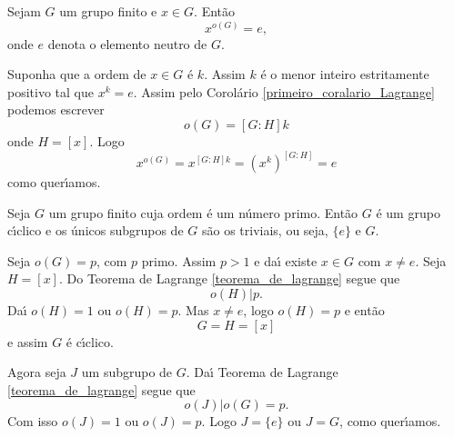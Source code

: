 \begin{corolario}
    Sejam $G$ um grupo finito e $x \in G$. Ent\~ao
    \[
        x^{o(G)} = e,
    \]
    onde $e$ denota o elemento neutro de $G$.
\end{corolario}
\begin{prova}
    Suponha que a ordem de $x \in G$ \'e $k$. Assim $k$ \'e o menor inteiro estritamente positivo tal que $x^k = e$. Assim pelo Corol\'ario \eqref{primeiro_coralario_Lagrange} podemos escrever
    \[
        o(G) = [G : H]k
    \]
    onde $H = [x]$. Logo
    \[
        x^{o(G)} = x^{[G : H]k} = (x^k)^{[G : H]} = e
    \]
    como quer{\'\i}amos.
\end{prova}

\begin{corolario}
    Seja $G$ um grupo finito cuja ordem \'e um n\'umero primo. Ent\~ao $G$ \'e um grupo c{\'\i}clico e os \'unicos subgrupos de $G$ s\~ao os triviais, ou seja, $\{e\}$ e $G$.
\end{corolario}
\begin{prova}
    Seja $o(G) = p$, com $p$ primo. Assim $p > 1$ e da{\'\i} existe $x \in G$ com $x \ne e$. Seja $H = [x]$. Do Teorema de Lagrange \eqref{teorema_de_lagrange} segue que
    \[
        o(H) | p.
    \]
    Da{\'\i} $o(H) = 1$ ou $o(H) = p$. Mas $x \ne e$, logo $o(H) = p$ e ent\~ao
    \[
        G = H = [x]
    \]
    e assim $G$ \'e c{\'\i}clico.

    Agora seja $J$ um subgrupo de $G$. Da{\'\i} Teorema de Lagrange \eqref{teorema_de_lagrange} segue que
    \[
        o(J) | o(G) = p.
    \]
    Com isso $o(J) = 1$ ou $o(J) = p$. Logo $J = \{e\}$ ou $J = G$, como quer{\'\i}amos.

\end{prova}
